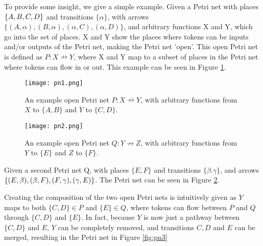 \documentclass[utf8,british]{cms-essay}
\begin{document}

To provide some insight, we give a simple example. Given a Petri net with places $\{A, B, C, \\
D\}$ and transitions $\{\alpha\}$, with arrows $\{(A, \alpha), (B, \alpha), (\alpha, C), (\alpha, D)\}$, and arbitrary functions X and Y, which go into the set of places. X and Y show the places where tokens can be inputs and/or outputs of the Petri net, making the Petri net 'open'. This open Petri net is defined as $P: X \nrightarrow Y$, where X and Y map to a subset of places in the Petri net where tokens can flow in or out. This example can be seen in Figure \ref{fig:pn1}.

\begin{figure}[h!]
    \centering
    \texttt{[image: pn1.png]}
    \caption{An example open Petri net $P: X \nrightarrow Y$, with arbitrary functions from $X$ to $\{A, B\}$ and $Y$ to $\{C, D\}$.}
    \label{fig:pn1}
\end{figure}



\begin{figure}[h!]
    \centering
    \texttt{[image: pn2.png]}
    \caption{An example open Petri net $Q: Y \nrightarrow Z$, with arbitrary functions from $Y$ to $\{E\}$ and $Z$ to $\{F\}$.}
    \label{fig:pn2}
\end{figure}

Given a second Petri net Q, with places $\{E, F\}$ and transitions $\{\beta. \gamma\}$, and arrows $\{(E, \beta), (\beta, F),\\
(F, \gamma), (\gamma, E)\}$. The Petri net can be seen in Figure \ref{fig:pn2}.

Creating the composition of the two open Petri nets is intuitively given as $Y$ maps to both $\{C, D\} \in P$ and $\{E\} \in Q$, where tokens can flow between $P$ and $Q$ through $\{C, D\}$ and $\{E\}$. In fact, because $Y$ is now just a pathway between $\{C, D\}$ and $E$, $Y$ can be completely removed, and transitions $C, D$ and $E$ can be merged, resulting in the Petri net in Figure \ref{fig:pn3}
\end{document}
